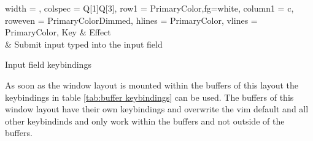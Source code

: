 \documentclass{report}
\begin{document}
\begin{table}[H]
	\centering
	\begin{tblr}{
		width = \linewidth,
		colspec = {Q[1]Q[3]},
		row{1} = {PrimaryColor,fg=white},
		column{1} = {c},
		row{even} = {PrimaryColorDimmed},
		hlines = {PrimaryColor},
		vlines = {PrimaryColor},
		}
		Key               & Effect                                  \\
		 & Submit input typed into the input field
	\end{tblr}
	\caption{Input field keybindings}
	\label{tab:input field keybindings}
\end{table}

As soon as the window layout is mounted within the buffers of this layout the keybindings in table \ref{tab:buffer keybindings} can be used. The buffers of this window layout have their own keybindings and overwrite the vim default and all other keybindinds and only work within the buffers and not outside of the buffers.
\end{document}
